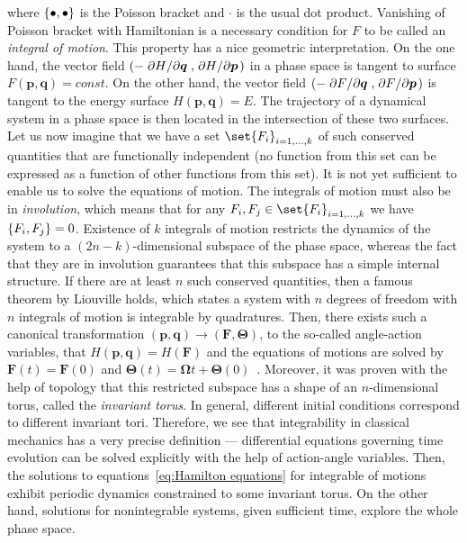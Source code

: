 where \(\poissonbracket{\bullet }{\bullet }\) is the Poisson bracket and \(\cdot\) is the usual dot product.
Vanishing of Poisson bracket with Hamiltonian is a necessary condition for \(F\)
to be called an \textit{integral of motion}. This property has a nice geometric interpretation.
On the one hand, the vector field \(\left(-\pdv*{H}{\bm{q}},\pdv*{H}{\bm{p}}\right)\) in a phase space is
tangent to surface \(F(\bm{p},\bm{q}) = const\). On the other hand, the vector field 
\(\left(-\pdv*{F}{\bm{q}},\pdv*{F}{\bm{p}}\right)\) is tangent to the energy surface \(H(\bm{p},\bm{q}) = E\).
The trajectory of a dynamical system in a phase space is then located in the intersection
of these two surfaces.
Let us now imagine that we have a set \(\set{F_i}_{i=1,\ldots,k}\) of such conserved
quantities that are functionally independent (no function from this set can be expressed
as a function of other functions from this set). It is not yet sufficient to enable us to solve
the equations of motion. The integrals of motion must also be in \textit{involution},
which means that for any \(F_i,F_j\in\set{F_i}_{i=1,\ldots,k}\) we have
\(\poissonbracket{F_i}{F_j} = 0\). Existence of \(k\) integrals of motion restricts
the dynamics of the system to a \((2n-k)\)-dimensional subspace of the phase space, whereas the fact
that they are in involution guarantees that this subspace has a simple internal structure.
If there are at least \(n\) such conserved quantities, then a famous theorem by
Liouville holds, which states a system with \(n\) degrees of freedom with
\(n\) integrals of motion is integrable by quadratures.
Then, there exists such a canonical transformation \((\bm{p},\bm{q})\to (\bm{F},\bm{\Theta})\), to the
so-called angle-action variables, that \(H(\bm{p},\bm{q}) = H(\bm{F})\) and the equations
of motions are solved by \(\bm{F}(t) = \bm{F}(0)\) and \(\bm{\Theta}(t) = \bm{\Omega} t + \bm{\Theta}(0)\)~\autocite{arnold2013mathematical}.
Moreover, it was proven with the help of topology that this restricted subspace
has a shape of an \(n\)-dimensional torus, called the \textit{invariant torus}. In
general, different initial conditions correspond to different invariant tori.
Therefore, we see that integrability in classical mechanics has a very precise 
definition --- differential equations governing time evolution can be solved explicitly
with the help of action-angle variables. Then, the solutions to equations~\ref{eq:Hamilton equations}
for integrable of motions exhibit periodic dynamics constrained to some invariant torus.
On the other hand, solutions for nonintegrable systems, given sufficient time, explore the whole
phase space.

